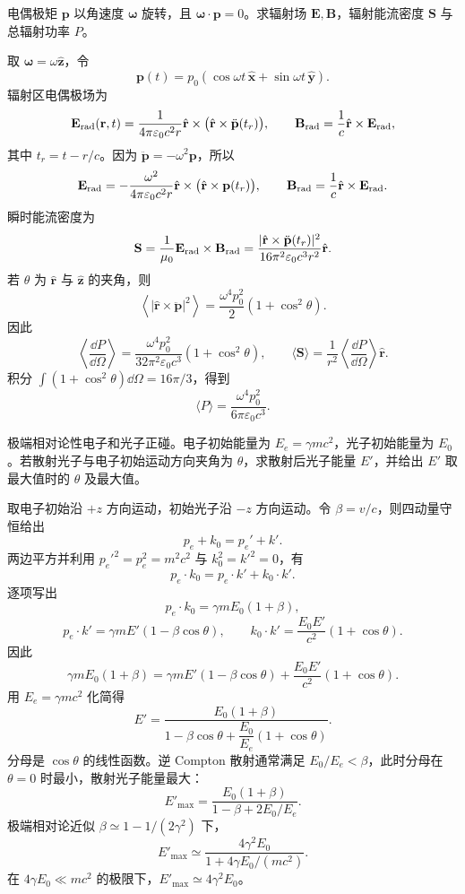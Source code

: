 \begin{question}[匀速旋转电偶极子的辐射]
电偶极矩 $\mathbf p$ 以角速度 $\boldsymbol\omega$ 旋转，且 $\boldsymbol\omega\cdot\mathbf p=0$。求辐射场 $\mathbf E,\mathbf B$，辐射能流密度 $\mathbf S$ 与总辐射功率 $P$。
\begin{solution}
取 $\boldsymbol\omega=\omega\hat{\mathbf z}$，令
\[
  \mathbf p(t)=p_0(\cos\omega t\,\hat{\mathbf x}+\sin\omega t\,\hat{\mathbf y}) .
\]
辐射区电偶极场为
\[
  \mathbf E_{\rm rad}(\mathbf r,t)
  =\frac{1}{4\pi\varepsilon_0c^2r}
  \hat{\mathbf r}\times\bigl(\hat{\mathbf r}\times\ddot{\mathbf p}(t_r)\bigr),
  \qquad
  \mathbf B_{\rm rad}=\frac{1}{c}\hat{\mathbf r}\times\mathbf E_{\rm rad},
\]
其中 $t_r=t-r/c$。因为 $\ddot{\mathbf p}=-\omega^2\mathbf p$，所以
\[
  \mathbf E_{\rm rad}
  =-\frac{\omega^2}{4\pi\varepsilon_0c^2r}
  \hat{\mathbf r}\times\bigl(\hat{\mathbf r}\times\mathbf p(t_r)\bigr),
  \qquad
  \mathbf B_{\rm rad}=\frac{1}{c}\hat{\mathbf r}\times\mathbf E_{\rm rad} .
\]
瞬时能流密度为
\[
  \mathbf S=\frac{1}{\mu_0}\mathbf E_{\rm rad}\times\mathbf B_{\rm rad}
  =\frac{|\hat{\mathbf r}\times\ddot{\mathbf p}(t_r)|^2}{16\pi^2\varepsilon_0c^3r^2}\hat{\mathbf r} .
\]
若 $\theta$ 为 $\hat{\mathbf r}$ 与 $\hat{\mathbf z}$ 的夹角，则
\[
  \left\langle |\hat{\mathbf r}\times\ddot{\mathbf p}|^2\right\rangle
  =\frac{\omega^4p_0^2}{2}(1+\cos^2\theta) .
\]
因此
\[
  \left\langle \frac{\dd{P}}{\dd{\Omega}}\right\rangle
  =\frac{\omega^4p_0^2}{32\pi^2\varepsilon_0c^3}(1+\cos^2\theta),
  \qquad
  \langle \mathbf S\rangle
  =\frac{1}{r^2}\left\langle\frac{\dd{P}}{\dd{\Omega}}\right\rangle\hat{\mathbf r} .
\]
  积分 $\int(1+\cos^2\theta)\dd{\Omega}=16\pi/3$，得到
\[
  \boxed{\langle P\rangle=\frac{\omega^4p_0^2}{6\pi\varepsilon_0c^3}} .
\]
\end{solution}
\end{question}

\begin{question}[极端相对论电子与光子的正碰]
极端相对论性电子和光子正碰。电子初始能量为 $E_e=\gamma mc^2$，光子初始能量为 $E_0$。若散射光子与电子初始运动方向夹角为 $\theta$，求散射后光子能量 $E'$，并给出 $E'$ 取最大值时的 $\theta$ 及最大值。
\begin{solution}
取电子初始沿 $+z$ 方向运动，初始光子沿 $-z$ 方向运动。令 $\beta=v/c$，则四动量守恒给出
\[
  p_e+k_0=p_e'+k' .
\]
两边平方并利用 $p_e'^2=p_e^2=m^2c^2$ 与 $k_0^2=k'^2=0$，有
\[
  p_e\cdot k_0=p_e\cdot k'+k_0\cdot k' .
\]
逐项写出
\[
  p_e\cdot k_0=\gamma mE_0(1+\beta),
\]
\[
  p_e\cdot k'=\gamma mE'(1-\beta\cos\theta),
  \qquad
  k_0\cdot k'=\frac{E_0E'}{c^2}(1+\cos\theta) .
\]
因此
\[
  \gamma mE_0(1+\beta)
  =\gamma mE'(1-\beta\cos\theta)+\frac{E_0E'}{c^2}(1+\cos\theta) .
\]
用 $E_e=\gamma mc^2$ 化简得
\[
  \boxed{
  E'=\frac{E_0(1+\beta)}{1-\beta\cos\theta+\dfrac{E_0}{E_e}(1+\cos\theta)} } .
\]
分母是 $\cos\theta$ 的线性函数。逆 Compton 散射通常满足 $E_0/E_e<\beta$，此时分母在 $\theta=0$ 时最小，散射光子能量最大：
\[
  E'_{\max}=\frac{E_0(1+\beta)}{1-\beta+2E_0/E_e} .
\]
极端相对论近似 $\beta\simeq1-1/(2\gamma^2)$ 下，
\[
  \boxed{E'_{\max}\simeq
  \frac{4\gamma^2E_0}{1+4\gamma E_0/(mc^2)}} .
\]
在 $4\gamma E_0\ll mc^2$ 的极限下，$E'_{\max}\simeq4\gamma^2E_0$。
\end{solution}
\end{question}

